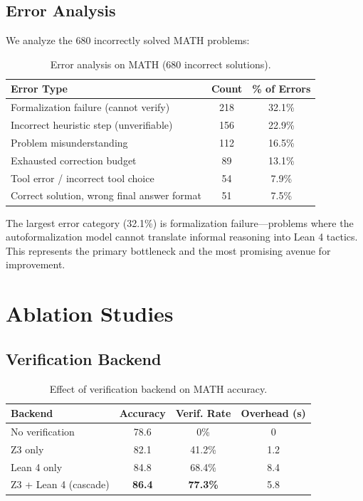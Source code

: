 \documentclass[11pt,a4paper]{article}
\begin{document}
\subsection{Error Analysis}

We analyze the 680 incorrectly solved MATH problems:

\begin{table}[t]
\centering
\caption{Error analysis on MATH (680 incorrect solutions).}
\label{tab:errors}
\begin{tabular}{lcc}
\toprule
\textbf{Error Type} & \textbf{Count} & \textbf{\% of Errors} \\
\midrule
Formalization failure (cannot verify) & 218 & 32.1\% \\
Incorrect heuristic step (unverifiable) & 156 & 22.9\% \\
Problem misunderstanding & 112 & 16.5\% \\
Exhausted correction budget & 89 & 13.1\% \\
Tool error / incorrect tool choice & 54 & 7.9\% \\
Correct solution, wrong final answer format & 51 & 7.5\% \\
\bottomrule
\end{tabular}
\end{table}

The largest error category (32.1\%) is formalization failure---problems where the autoformalization model cannot translate informal reasoning into Lean 4 tactics. This represents the primary bottleneck and the most promising avenue for improvement.

\section{Ablation Studies}
\label{sec:ablation}

\subsection{Verification Backend}

\begin{table}[t]
\centering
\caption{Effect of verification backend on MATH accuracy.}
\label{tab:backend}
\begin{tabular}{lccc}
\toprule
\textbf{Backend} & \textbf{Accuracy} & \textbf{Verif. Rate} & \textbf{Overhead (s)} \\
\midrule
No verification & 78.6 & 0\% & 0 \\
Z3 only & 82.1 & 41.2\% & 1.2 \\
Lean 4 only & 84.8 & 68.4\% & 8.4 \\
Z3 + Lean 4 (cascade) & \textbf{86.4} & \textbf{77.3\%} & 5.8 \\
\bottomrule
\end{tabular}
\end{table}
\end{document}
